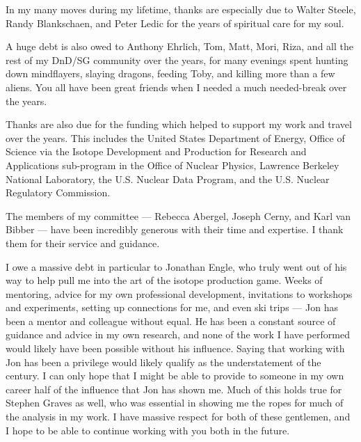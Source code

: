 \documentclass[
]{ucbthesis}
\begin{document}
\begin{frontmatter}
\begin{acknowledgements}
In my many moves during my lifetime, thanks are especially due to Walter Steele, Randy Blankschaen, and Peter Ledic for the years of spiritual care for my soul.

A huge debt is also owed to Anthony Ehrlich, Tom,  Matt, Mori, Riza, and all the rest of my DnD/SG community over the years, for many evenings spent hunting down mindflayers, slaying dragons, feeding Toby, and killing more than a few aliens.
You all have been great friends when I needed a much needed-break over the years.




Thanks are also due for the funding which helped to support my work and travel over the years. 
This  includes  the United States Department of Energy, Office of Science via the Isotope Development and Production for Research and Applications sub-program in the Office of Nuclear Physics,  Lawrence Berkeley National Laboratory,   the U.S. Nuclear Data Program, and  the U.S. Nuclear Regulatory Commission.



The members of my committee --- Rebecca Abergel, Joseph Cerny, and Karl van Bibber --- have been incredibly generous with their time and expertise. I thank them for their service and guidance.


I owe a massive debt in particular to Jonathan Engle, who truly went out of his way to help pull me into the art of the isotope production game.
Weeks of mentoring, advice for my own professional development, invitations to workshops and experiments, setting up connections for me, and even ski trips  ---  Jon has been a mentor and colleague without equal.
He has been a constant source of guidance and advice in my own research, and none of the work I have performed would likely have been possible without his influence. 
Saying that working with Jon has been a privilege would likely qualify as the understatement of the century.  
I can only hope that I might be able to provide to someone in my own career half of the influence that Jon has shown me.
Much of this holds true for Stephen Graves as well, who was essential in showing me the ropes for much of the analysis in my work.
I have massive respect for both of these gentlemen, and I hope to be able to continue working with you both in the future.






\end{acknowledgements}
\end{frontmatter}
\end{document}
